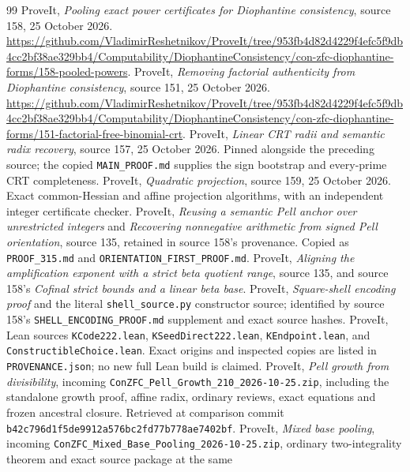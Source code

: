 \begingroup\small
\begin{thebibliography}{99}
 ProveIt, \emph{Pooling exact power certificates for
Diophantine consistency}, source 158, 25 October 2026.
\url{https://github.com/VladimirReshetnikov/ProveIt/tree/953fb4d82d4229f4efc5f9db4cc2bf38ae329bb4/Computability/DiophantineConsistency/con-zfc-diophantine-forms/158-pooled-powers}.
 ProveIt, \emph{Removing factorial authenticity from
Diophantine consistency}, source 151, 25 October 2026.
\url{https://github.com/VladimirReshetnikov/ProveIt/tree/953fb4d82d4229f4efc5f9db4cc2bf38ae329bb4/Computability/DiophantineConsistency/con-zfc-diophantine-forms/151-factorial-free-binomial-crt}.
 ProveIt, \emph{Linear CRT radii and semantic radix
recovery}, source 157, 25 October 2026. Pinned alongside the preceding source;
the copied \nolinkurl{MAIN_PROOF.md} supplies the sign bootstrap and
every-prime CRT completeness.
 ProveIt, \emph{Quadratic projection}, source 159,
25 October 2026. Exact common-Hessian and affine projection algorithms,
with an independent integer certificate checker.
 ProveIt, \emph{Reusing a semantic Pell anchor over
unrestricted integers} and \emph{Recovering nonnegative arithmetic from
signed Pell orientation}, source 135, retained in source 158's provenance.
Copied as \nolinkurl{PROOF_315.md} and \nolinkurl{ORIENTATION_FIRST_PROOF.md}.
 ProveIt, \emph{Aligning the amplification exponent
with a strict beta quotient range}, source 135, and source 158's
\emph{Cofinal strict bounds and a linear beta base}.
 ProveIt, \emph{Square-shell encoding proof} and the literal
\nolinkurl{shell_source.py} constructor source; identified by source 158's
\nolinkurl{SHELL_ENCODING_PROOF.md} supplement and exact source hashes.
 ProveIt, Lean sources \nolinkurl{KCode222.lean},
\nolinkurl{KSeedDirect222.lean}, \nolinkurl{KEndpoint.lean}, and
\nolinkurl{ConstructibleChoice.lean}. Exact origins and inspected copies are
listed in \nolinkurl{PROVENANCE.json}; no new full Lean build is claimed.
 ProveIt, \emph{Pell growth from divisibility},
incoming \nolinkurl{ConZFC_Pell_Growth_210_2026-10-25.zip},
including the standalone growth proof, affine radix, ordinary reviews,
exact equations and frozen ancestral closure. Retrieved at comparison
commit \nolinkurl{b42c796d1f5de9912a576bc2fd77b778ae7402bf}.
 ProveIt, \emph{Mixed base pooling}, incoming
\nolinkurl{ConZFC_Mixed_Base_Pooling_2026-10-25.zip},
ordinary two-integrality theorem and exact source package at the same

\end{thebibliography}
